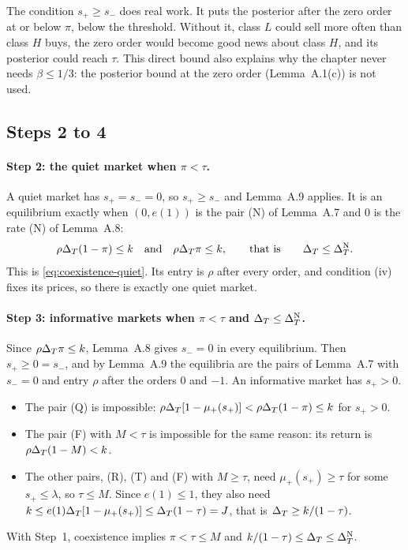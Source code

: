 \begin{watchout}
The condition \(s_+\ge s_-\) does real work. It puts the posterior after the zero order at or below \(\pi\), below the
threshold. Without it, class \(L\) could sell more often than class \(H\) buys, the zero order would become good news
about class \(H\), and its posterior could reach \(\tau\). This direct bound also explains why the chapter never needs
\(\beta\le1/3\): the posterior bound at the zero order (Lemma~A.1(c)) is not used.
\end{watchout}

\subsection{Steps 2 to 4}

\paragraph{Step 2: the quiet market when \(\pi<\tau\).} A quiet market has \(s_+=s_-=0\), so \(s_+\ge s_-\) and
Lemma~A.9 applies. It is an equilibrium exactly when \((0,e(1))\) is the pair (N) of Lemma~A.7 and \(0\) is the rate
(N) of Lemma~A.8:
\[
\rho\Delta_T(1-\pi)\le k\quad\text{and}\quad\rho\Delta_T\pi\le k,\qquad\text{that is}\qquad\Delta_T\le\Delta_T^{\rm N}.
\]
This is \eqref{eq:coexistence-quiet}. Its entry is \(\rho\) after every order, and condition (iv) fixes its prices,
so there is exactly one quiet market.

\paragraph{Step 3: informative markets when \(\pi<\tau\) and \(\Delta_T\le\Delta_T^{\rm N}\).}

\begin{derivation}[necessity]
Since \(\rho\Delta_T\pi\le k\), Lemma~A.8 gives \(s_-=0\) in every equilibrium. Then \(s_+\ge0=s_-\), and by Lemma~A.9 the
equilibria are the pairs of Lemma~A.7 with \(s_-=0\) and entry \(\rho\) after the orders \(0\) and \(-1\). An
informative market has \(s_+>0\).
\begin{itemize}
\item The pair (Q) is impossible: \(\rho\Delta_T[1-\mu_+(s_+)]<\rho\Delta_T(1-\pi)\le k\) for \(s_+>0\).
\item The pair (F) with \(M<\tau\) is impossible for the same reason: its return is \(\rho\Delta_T(1-M)<k\).
\item The other pairs, (R), (T) and (F) with \(M\ge\tau\), need \(\mu_+(s_+)\ge\tau\) for some \(s_+\le\lambda\), so
\(\tau\le M\). Since \(e(1)\le1\), they also need \(k\le e(1)\Delta_T[1-\mu_+(s_+)]\le\Delta_T(1-\tau)=J\), that is
\(\Delta_T\ge k/(1-\tau)\).
\end{itemize}
With Step~1, coexistence implies \(\pi<\tau\le M\) and \(k/(1-\tau)\le\Delta_T\le\Delta_T^{\rm N}\).
\end{derivation}

